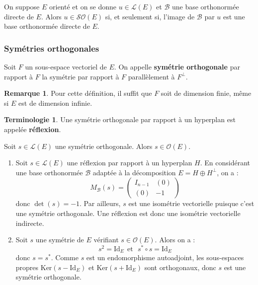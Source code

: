 \documentclass[french]{article}
\newcommand{\st}{^*}
\renewcommand{\ker}{\text{Ker}}
\theoremstyle{plain}
\theoremstyle{definition}
\newtheorem*{rmq}{Remarque}
\newtheorem*{terminologie}{Terminologie}
\theoremstyle{remark}
\begin{document}
\begin{prop}
	On suppose $E$ orienté et on se donne $u\in\mathcal{L}(E)$ et $\mathcal{B}$ une base orthonormée directe de $E$. Alors $u\in\mathcal{SO}(E)$ si, et seulement si, l'image de $\mathcal{B}$ par $u$ est une base orthonormée directe de $E$.
\end{prop}

\subsubsection*{Symétries orthogonales}

\begin{dfn}
	Soit $F$ un sous-espace vectoriel de $E$. On appelle \textbf{symétrie orthogonale} par rapport à $F$ la symétrie par rapport à $F$ parallèlement à $F^\bot$.
\end{dfn}

\begin{rmq}
	Pour cette définition, il suffit que $F$ soit de dimension finie, même si $E$ est de dimension infinie.
\end{rmq}

\begin{terminologie}
	Une symétrie orthogonale par rapport à un hyperplan est appelée \textbf{réflexion}.
\end{terminologie}

\begin{prop}
	Soit $s\in\mathcal{L}(E)$ une symétrie orthogonale. Alors $s\in\mathcal{O}(E)$.
\end{prop}

\begin{exo}
	\begin{enumerate}
		\item Soit $s\in\mathcal{L}(E)$ une réflexion par rapport à un hyperplan $H$. En considérant une base orthonormée $\mathcal{B}$ adaptée à la décomposition $E=H\oplus H^\bot$, on a : $$M_\mathcal{B}(s)=\begin{pmatrix}
			I_{n-1}&(0)\\
			(0)&-1
		\end{pmatrix}$$ donc $\det(s)=-1$. Par ailleurs, $s$ est une isométrie vectorielle puisque c'est une symétrie orthogonale. Une réflexion est donc une isométrie vectorielle indirecte.
		\item Soit $s$ une symétrie de $E$ vérifiant $s\in\mathcal{O}(E)$. Alors on a : $$s^2=\text{Id}_E\ \ \text{et}\ \ \ s\st\circ s=\text{Id}_E$$ donc $s=s\st$. Comme $s$ est un endomorphisme autoadjoint, les sous-espaces propres $\ker(s-\text{Id}_E)$ et $\ker(s+\text{Id}_E)$ sont orthogonaux, donc $s$ est une symétrie orthogonale.
	\end{enumerate}
\end{exo}
\end{document}
